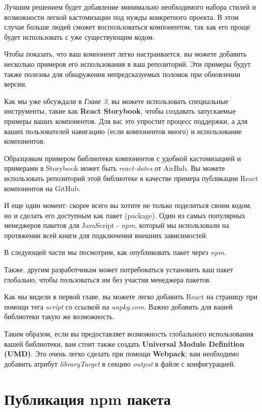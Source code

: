 Лучшим решением будет добавление минимально необходимого набора стилей и возможности легкой кастомизации под нужды конкретного проекта. В этом случае больше людей сможет воспользоваться компонентом, так как его проще будет использовать с уже существующим кодом.

Чтобы показать, что ваш компонент легко настраивается, вы можете добавить несколько примеров его использования в ваш репозиторий. Эти примеры будут также полезны для обнаружения непредсказуемых поломок при обновлении версии.

Как мы уже обсуждали в \textit{Главе 3}, вы можете использовать специальные инструменты, такие как \textbf{React Storybook}, чтобы создавать запускаемые примеры ваших компонентов. Для вас это упростит процесс поддержки, а для ваших пользователей навигацию (если компонентов много) и использование компонентов.

Образцовым примером библиотеки компонентов с удобной кастомизацией и примерами в Storybook может быть \textit{react-dates} от AirBnb. Вы можете использовать репозиторий этой библиотеке в качестве примера публикации React компонентов на GitHub.

И еще один момент: скорее всего вы хотите не только поделиться своим кодом, но и сделать его доступным как пакет (package). Один из самых популярных менеджеров пакетов для JavaScript - \textit{npm}, который мы использовали на протяжении всей книги для подключения внешних зависимостей.

В следующей части мы посмотрим, как опубликовать пакет через \textit{npm}.
 
Также, другим разработчикам может потребоваться установить ваш пакет глобально, чтобы пользоваться им без участия менеджера пакетов.

Как мы видели в первой главе, вы можете легко добавить React на страницу при помощи тега \textit{script} со ссылкой на \textit{unpkg.com}. Важно добавить для вашей библиотеки такую же возможность.

Таким образом, если вы предоставляет возможность глобального использования вашей библиотеки, вам стоит также создать \textbf{Universal Module Definition (UMD)}. Это очень легко сделать при помощи \textbf{Webpack}; вам необходимо добавить атрибут \textit{libraryTarget} в секцию \textit{output} в файле с конфигурацией.

\section{Публикация npm пакета}


